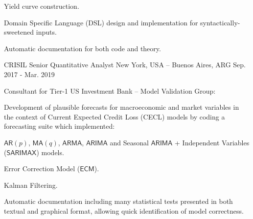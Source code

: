 \begin{cventries}
{\begin{cvitems}
{\begin{cvitems}
              \item Yield curve construction.
              \item Domain Specific Language (DSL) design and implementation for
              syntactically-sweetened inputs.
              \item Automatic documentation for both code and theory.
          \end{cvitems}
          \vspace{+4.0mm}
        }
      \end{cvitems}
      \vspace{1em}
    }

  \cventry
    {CRISIL}
    {Senior Quantitative Analyst}
    {New York, USA -- Buenos Aires, ARG}
    {Sep. 2017 - Mar. 2019}
    {
      \begin{cvitems}
        \item{Consultant for Tier-1 US Investment Bank – Model Validation Group:
          \vspace{+6.0mm}
          \begin{cvitems}
              \item {Development of plausible forecasts for macroeconomic and market
              variables in the context of Current Expected Credit Loss (CECL) models by
              coding a forecasting suite which implemented:
                \vspace{+6.0mm}
                \begin{cvitems}
                  \item $\textsf{AR}(p)$, $\textsf{MA}(q)$, $\textsf{ARMA}$,
                  $\textsf{ARIMA}$ and Seasonal $\textsf{ARIMA}$ + Independent Variables
                  ($\textsf{SARIMAX}$) models.
                  \item Error Correction Model ($\textsf{ECM}$).
                  \item Kalman Filtering.
                  \item Automatic documentation including many statistical tests presented
                  in both textual and graphical format, allowing quick identification of
                  model correctness.
                \end{cvitems}
                \vspace{+4.0mm}
              }
          \end{cvitems}
          \vspace{+8.0mm}
}
\end{cvitems}}
\end{cventries}
